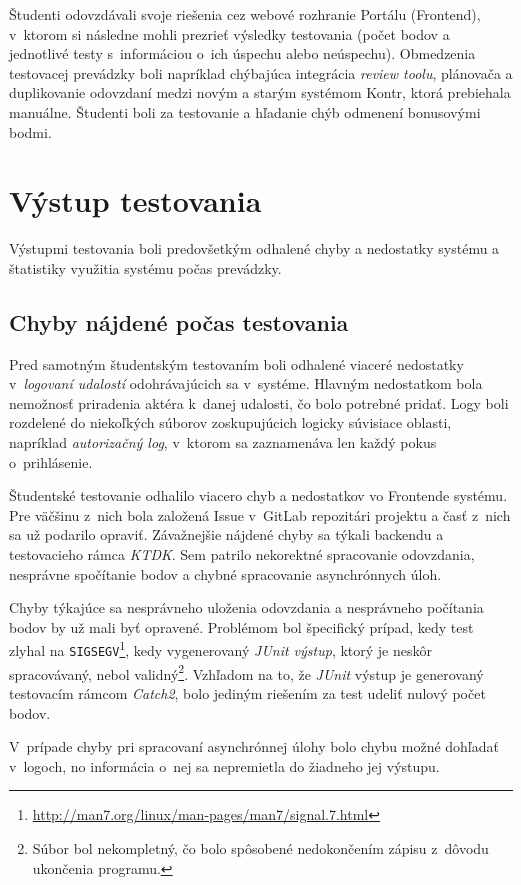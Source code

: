 \documentclass[
  digital, %
  oneside, %
  table,   %
  lof,     %
  lot,   %
]{fithesis3}
\begin{document}
Študenti odovzdávali svoje riešenia cez webové rozhranie Portálu (Frontend), v~ktorom si následne mohli prezrieť výsledky testovania (počet bodov a jednotlivé testy s~informáciou o~ich úspechu alebo neúspechu). Obmedzenia testovacej prevádzky boli napríklad chýbajúca integrácia \emph{review toolu}, plánovača a duplikovanie odovzdaní medzi novým a starým systémom Kontr, ktorá prebiehala manuálne. Študenti boli za testovanie a hľadanie chýb odmenení bonusovými bodmi.

\section{Výstup testovania}
Výstupmi testovania boli predovšetkým odhalené chyby a nedostatky systému a štatistiky využitia systému počas prevádzky.

\subsection{Chyby nájdené počas testovania}

Pred samotným študentským testovaním boli odhalené viaceré nedostatky v~\emph{logovaní udalostí} odohrávajúcich sa v~systéme. Hlavným nedostatkom bola nemožnosť priradenia aktéra k~danej udalosti, čo bolo potrebné pridať. Logy boli rozdelené do niekoľkých súborov zoskupujúcich logicky súvisiace oblasti, napríklad \emph{autorizačný log}, v~ktorom sa zaznamenáva len každý pokus o~prihlásenie.

Študentské testovanie odhalilo viacero chyb a nedostatkov vo Frontende systému. Pre väčšinu z~nich bola založená Issue v~GitLab repozitári projektu a časť z~nich sa už podarilo opraviť. Závažnejšie nájdené chyby sa týkali backendu a testovacieho rámca \emph{KTDK}. Sem patrilo nekorektné spracovanie odovzdania, nesprávne spočítanie bodov a chybné spracovanie asynchrónnych úloh.

Chyby týkajúce sa nesprávneho uloženia odovzdania a nesprávneho počítania bodov by už mali byť opravené. Problémom bol špecifický prípad, kedy test zlyhal na \texttt{SIGSEGV}\footnote{\url{http://man7.org/linux/man-pages/man7/signal.7.html}}, kedy vygenerovaný \emph{JUnit výstup}, ktorý je neskôr spracovávaný, nebol validný\footnote{Súbor bol nekompletný, čo bolo spôsobené nedokončením zápisu z~dôvodu ukončenia programu.}. Vzhľadom na to, že \emph{JUnit} výstup je generovaný testovacím rámcom \emph{Catch2}, bolo jediným riešením za test udeliť nulový počet bodov.

V~prípade chyby pri spracovaní asynchrónnej úlohy bolo chybu možné dohľadať v~logoch, no informácia o~nej sa nepremietla do žiadneho jej výstupu.
\end{document}
